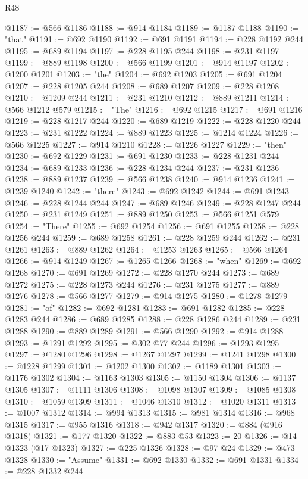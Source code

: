 \begin{lexlean}{R48}
\begin{coremodule}
@1187 := @566 @1186
@1188 := @914 @1184
@1189 := @1187 @1188
@1190 := "that"
@1191 := @692 @1190
@1192 := @691 @1191
@1194 := @228 @1192 @244
@1195 := @689 @1194
@1197 := @228 @1195 @244
@1198 := @231 @1197
@1199 := @889 @1198
@1200 := @566 @1199
@1201 := @914 @1197
@1202 := @1200 @1201
@1203 := "the"
@1204 := @692 @1203
@1205 := @691 @1204
@1207 := @228 @1205 @244
@1208 := @689 @1207
@1209 := @228 @1208
@1210 := @1209 @244
@1211 := @231 @1210
@1212 := @889 @1211
@1214 := @566 @1212 @579
@1215 := "The"
@1216 := @692 @1215
@1217 := @691 @1216
@1219 := @228 @1217 @244
@1220 := @689 @1219
@1222 := @228 @1220 @244
@1223 := @231 @1222
@1224 := @889 @1223
@1225 := @1214 @1224
@1226 := @566 @1225
@1227 := @914 @1210
@1228 := @1226 @1227
@1229 := "then"
@1230 := @692 @1229
@1231 := @691 @1230
@1233 := @228 @1231 @244
@1234 := @689 @1233
@1236 := @228 @1234 @244
@1237 := @231 @1236
@1238 := @889 @1237
@1239 := @566 @1238
@1240 := @914 @1236
@1241 := @1239 @1240
@1242 := "there"
@1243 := @692 @1242
@1244 := @691 @1243
@1246 := @228 @1244 @244
@1247 := @689 @1246
@1249 := @228 @1247 @244
@1250 := @231 @1249
@1251 := @889 @1250
@1253 := @566 @1251 @579
@1254 := "There"
@1255 := @692 @1254
@1256 := @691 @1255
@1258 := @228 @1256 @244
@1259 := @689 @1258
@1261 := @228 @1259 @244
@1262 := @231 @1261
@1263 := @889 @1262
@1264 := @1253 @1263
@1265 := @566 @1264
@1266 := @914 @1249
@1267 := @1265 @1266
@1268 := "when"
@1269 := @692 @1268
@1270 := @691 @1269
@1272 := @228 @1270 @244
@1273 := @689 @1272
@1275 := @228 @1273 @244
@1276 := @231 @1275
@1277 := @889 @1276
@1278 := @566 @1277
@1279 := @914 @1275
@1280 := @1278 @1279
@1281 := "of"
@1282 := @692 @1281
@1283 := @691 @1282
@1285 := @228 @1283 @244
@1286 := @689 @1285
@1288 := @228 @1286 @244
@1289 := @231 @1288
@1290 := @889 @1289
@1291 := @566 @1290
@1292 := @914 @1288
@1293 := @1291 @1292
@1295 := @302 @77 @244
@1296 := @1293 @1295
@1297 := @1280 @1296
@1298 := @1267 @1297
@1299 := @1241 @1298
@1300 := @1228 @1299
@1301 := @1202 @1300
@1302 := @1189 @1301
@1303 := @1176 @1302
@1304 := @1163 @1303
@1305 := @1150 @1304
@1306 := @1137 @1305
@1307 := @1111 @1306
@1308 := @1098 @1307
@1309 := @1085 @1308
@1310 := @1059 @1309
@1311 := @1046 @1310
@1312 := @1020 @1311
@1313 := @1007 @1312
@1314 := @994 @1313
@1315 := @981 @1314
@1316 := @968 @1315
@1317 := @955 @1316
@1318 := @942 @1317
@1320 := @884 (@916 @1318)
@1321 := @177 @1320
@1322 := @883 @53
@1323 := 20
@1326 := @14 @1323 (@17 @1323)
@1327 := @225 @1326
@1328 := @97 @24
@1329 := @473 @1328
@1330 := "Assume"
@1331 := @692 @1330
@1332 := @691 @1331
@1334 := @228 @1332 @244

\end{coremodule}
\end{lexlean}
